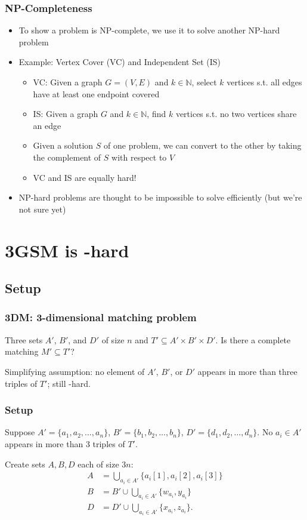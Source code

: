 \documentclass[mathserif,serif]{beamer}
\begin{document}
\begin{frame}
  \frametitle{NP-Completeness}
  \begin{itemize}
  \item To show a problem is  NP-complete, we use it to solve another NP-hard problem
  \item Example: Vertex Cover (VC) and Independent Set (IS)
    \begin{itemize}
    \item VC: Given a graph $G = (V, E)$ and $k \in \mathbb{N}$, select $k$ vertices s.t. all edges have at least one endpoint covered
    \item IS: Given a graph $G$ and $k \in \mathbb{N}$, find $k$ vertices s.t. no two vertices share an edge
    \item Given a solution $S$ of one problem, we can convert to the other by taking the complement of $S$ with respect to $V$
    \item VC and IS are equally hard!
    \end{itemize}
  \item NP-hard problems are thought to be impossible to solve efficiently (but we're not sure yet)
  \end{itemize}
\end{frame}


\section{3GSM is \NP-hard}

\subsection{Setup}

\begin{frame}
	\frametitle{3DM: 3-dimensional matching problem}

	Three sets $A'$, $B'$, and $D'$ of size $n$ and $T' \subseteq A' \times B' \times D'$.  Is there a complete
	matching $M' \subseteq T'$?

	Simplifying assumption: no element of $A'$, $B'$, or $D'$ appears in more than three triples of $T'$; still \NP-hard.
\end{frame}

\begin{frame}
	\frametitle{Setup}

	Suppose $A' = \{a_1, a_2, \dots, a_n\}$, $B' = \{b_1, b_2, \dots, b_n\}$, $D' = \{d_1, d_2, \dots, d_n\}$.  No
	$a_i \in A'$ appears in more than 3 triples of $T'$.

	Create sets $A, B, D$ each of size $3n$:
	\begin{align*}
	A &= \bigcup_{a_i \in A'} \{a_i[1], a_i[2], a_i[3]\} \\
	B &= B' \cup \bigcup_{a_i \in A'} \{w_{a_i}, y_{a_i}\} \\
	D &= D' \cup \bigcup_{a_i \in A'} \{x_{a_i}, z_{a_i}\}.
	\end{align*}
\end{frame}
\end{document}
